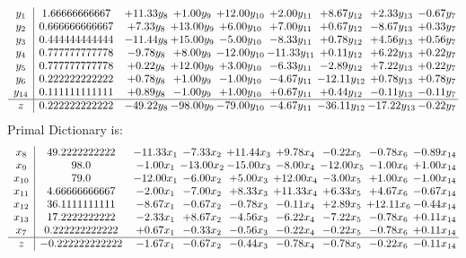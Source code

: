 \documentclass[9pt]{article}
\begin{document}
\[\begin{array}{c| c c@{\hskip 2pt} c@{\hskip 2pt} c@{\hskip 2pt} c@{\hskip 2pt} c@{\hskip 2pt} c@{\hskip 2pt} c@{\hskip 2pt} }
 y_{1}   &  1.66666666667 & + 11.33 y_{8} & +  1.00 y_{9} & + 12.00 y_{10} & +  2.00 y_{11} & +  8.67 y_{12} & +  2.33 y_{13} & -0.67 y_{7}\\
 y_{2}   &  0.666666666667 & +  7.33 y_{8} & + 13.00 y_{9} & +  6.00 y_{10} & +  7.00 y_{11} & +  0.67 y_{12} & -8.67 y_{13} & +  0.33 y_{7}\\
 y_{3}   &  0.444444444444 & -11.44 y_{8} & + 15.00 y_{9} & -5.00 y_{10} & -8.33 y_{11} & +  0.78 y_{12} & +  4.56 y_{13} & +  0.56 y_{7}\\
 y_{4}   &  0.777777777778 & -9.78 y_{8} & +  8.00 y_{9} & -12.00 y_{10} & -11.33 y_{11} & +  0.11 y_{12} & +  6.22 y_{13} & +  0.22 y_{7}\\
 y_{5}   &  0.777777777778 & +  0.22 y_{8} & + 12.00 y_{9} & +  3.00 y_{10} & -6.33 y_{11} & -2.89 y_{12} & +  7.22 y_{13} & +  0.22 y_{7}\\
 y_{6}   &  0.222222222222 & +  0.78 y_{8} & +  1.00 y_{9} & -1.00 y_{10} & -4.67 y_{11} & -12.11 y_{12} & +  0.78 y_{13} & +  0.78 y_{7}\\
 y_{14}   &  0.111111111111 & +  0.89 y_{8} & -1.00 y_{9} & +  1.00 y_{10} & +  0.67 y_{11} & +  0.44 y_{12} & -0.11 y_{13} & -0.11 y_{7}\\
\hline
z    &  0.222222222222 & -49.22 y_{8} & -98.00 y_{9} & -79.00 y_{10} & -4.67 y_{11} & -36.11 y_{12} & -17.22 y_{13} & -0.22 y_{7}\\
\end{array}\]
Primal Dictionary is:
\[\begin{array}{c| c c@{\hskip 2pt} c@{\hskip 2pt} c@{\hskip 2pt} c@{\hskip 2pt} c@{\hskip 2pt} c@{\hskip 2pt} c@{\hskip 2pt} }
 x_{8}   &  49.2222222222 & -11.33 x_{1} & -7.33 x_{2} & + 11.44 x_{3} & +  9.78 x_{4} & -0.22 x_{5} & -0.78 x_{6} & -0.89 x_{14}\\
 x_{9}   &  98.0 & -1.00 x_{1} & -13.00 x_{2} & -15.00 x_{3} & -8.00 x_{4} & -12.00 x_{5} & -1.00 x_{6} & +  1.00 x_{14}\\
 x_{10}   &  79.0 & -12.00 x_{1} & -6.00 x_{2} & +  5.00 x_{3} & + 12.00 x_{4} & -3.00 x_{5} & +  1.00 x_{6} & -1.00 x_{14}\\
 x_{11}   &  4.66666666667 & -2.00 x_{1} & -7.00 x_{2} & +  8.33 x_{3} & + 11.33 x_{4} & +  6.33 x_{5} & +  4.67 x_{6} & -0.67 x_{14}\\
 x_{12}   &  36.1111111111 & -8.67 x_{1} & -0.67 x_{2} & -0.78 x_{3} & -0.11 x_{4} & +  2.89 x_{5} & + 12.11 x_{6} & -0.44 x_{14}\\
 x_{13}   &  17.2222222222 & -2.33 x_{1} & +  8.67 x_{2} & -4.56 x_{3} & -6.22 x_{4} & -7.22 x_{5} & -0.78 x_{6} & +  0.11 x_{14}\\
 x_{7}   &  0.222222222222 & +  0.67 x_{1} & -0.33 x_{2} & -0.56 x_{3} & -0.22 x_{4} & -0.22 x_{5} & -0.78 x_{6} & +  0.11 x_{14}\\
\hline
z    &  -0.222222222222 & -1.67 x_{1} & -0.67 x_{2} & -0.44 x_{3} & -0.78 x_{4} & -0.78 x_{5} & -0.22 x_{6} & -0.11 x_{14}\\
\end{array}\]
\end{document}
